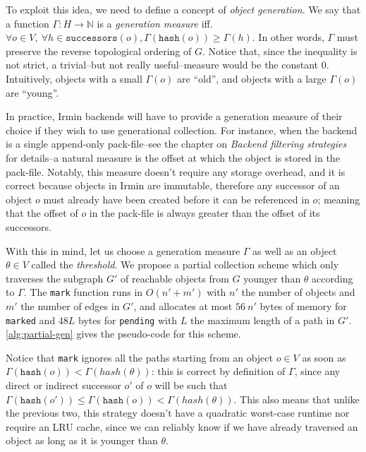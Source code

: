 To exploit this idea, we need to define a concept of \emph{object generation}. We say that a function \(\Gamma : H \rightarrow \mathbb{N}\) is a \emph{generation measure} iff. \(\forall o \in V,\ \forall h \in \texttt{successors}(o), \Gamma(\texttt{hash}(o)) \geq \Gamma(h)\). In other words, \(\Gamma\) must preserve the reverse topological ordering of \(G\). Notice that, since the inequality is not strict, a trivial--but not really useful--measure would be the constant \(0\). Intuitively, objects with a small \(\Gamma(o)\) are ``old'', and objects with a large \(\Gamma(o)\) are ``young''.

In practice, Irmin backends will have to provide a generation measure of their choice if they wish to use generational collection. For instance, when the backend is a single append-only pack-file--see the chapter on \emph{Backend filtering strategies} for details--a natural measure is the offset at which the object is stored in the pack-file. Notably, this measure doesn't require any storage overhead, and it is correct because objects in Irmin are immutable, therefore any successor of an object \(o\) must already have been created before it can be referenced in \(o\); meaning that the offset of \(o\) in the pack-file is always greater than the offset of its successors.

With this in mind, let us choose a generation measure \(\Gamma\) as well as an object \(\theta \in V\) called the \emph{threshold}. We propose a partial collection scheme which only traverses the subgraph \(G'\) of reachable objects from \(G\) younger than \(\theta\) according to \(\Gamma\). The \texttt{mark} function runs in \(O(n' + m')\) with \(n'\) the number of objects and \(m'\) the number of edges in \(G'\), and allocates at most \(56\ n'\) bytes of memory for \texttt{marked} and \(48L\) bytes for \texttt{pending} with \(L\) the maximum length of a path in \(G'\). \cref{alg:partial-gen} gives the pseudo-code for this scheme.



Notice that \texttt{mark} ignores all the paths starting from an object \(o \in V\) as soon as \(\Gamma(\texttt{hash}(o)) < \Gamma(hash(θ))\): this is correct by definition of \(\Gamma\), since any direct or indirect successor \(o'\) of \(o\) will be such that \(\Gamma(\texttt{hash}(o')) \leq \Gamma(\texttt{hash}(o)) < \Gamma(hash(θ))\). This also means that unlike the previous two, this strategy doesn't have a quadratic worst-case runtime nor require an LRU cache, since we can reliably know if we have already traversed an object as long as it is younger than \(\theta\).
